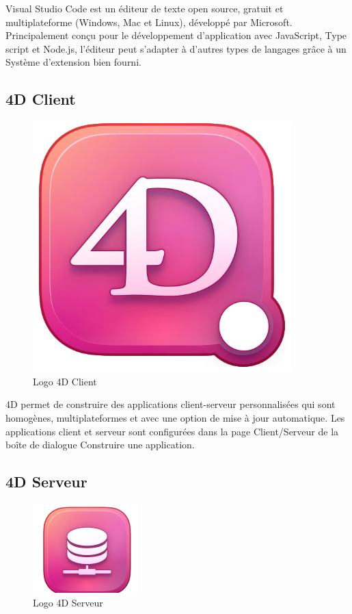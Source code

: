 Visual Studio Code est un éditeur de texte open source, gratuit et multiplateforme (Windows, Mac et Linux), développé
par Microsoft. Principalement conçu pour le développement
d’application avec JavaScript, Type script et Node.js, l’éditeur peut s’adapter à d’autres types de langages grâce à un
Système d’extension bien fourni. \cite{VS}

\subsection{4D Client}

\begin{figure}[H]
    \centering
    \includegraphics[scale=0.5]{Logos/4dClient.PNG}
    \caption{Logo  4D Client}
\end{figure}
4D  permet de construire des applications client-serveur personnalisées qui sont homogènes, multiplateformes
et avec une option de mise à jour automatique. Les applications client et serveur sont configurées dans la page
Client/Serveur de la boîte de dialogue Construire une application.

\subsection{4D Serveur}


\begin{figure}[H]
    \centering
    \includegraphics[scale=1.5]{Logos/4dServeyr.PNG}
    \caption{Logo 4D Serveur}
\end{figure}

